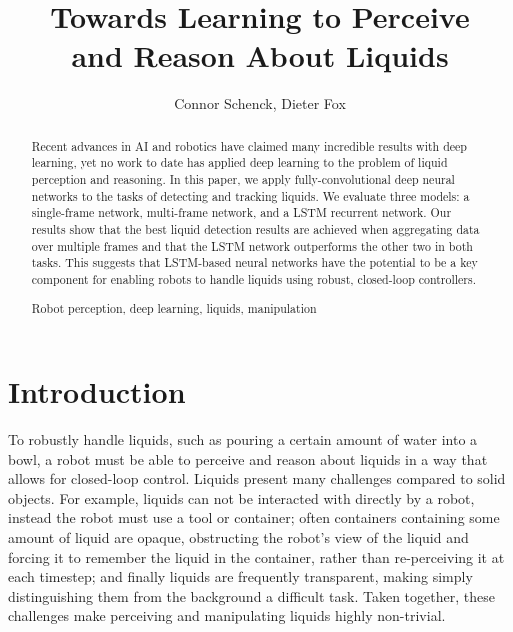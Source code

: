\documentclass[runningheads,a4paper]{llncs}
\newcommand{\keywords}[1]{\par\addvspace\baselineskip
\noindent\keywordname\enspace\ignorespaces#1}
\begin{document}
\mainmatter  %

\title{Towards Learning to Perceive \\and Reason About Liquids \vspace{-0.5cm}}



\author{Connor Schenck, Dieter Fox \vspace{-0.3cm}}



\maketitle

\vspace{-0.5cm}
\begin{abstract}
Recent advances in AI and robotics have claimed many incredible results with deep learning, yet no work to date has applied deep learning to the problem of liquid perception and reasoning. In this paper, we apply fully-convolutional deep neural networks to the tasks of detecting and tracking liquids. We evaluate three models: a single-frame network, multi-frame network, and a LSTM recurrent network. Our results show that the best liquid detection results are achieved when aggregating data over multiple frames and that the LSTM network outperforms the other two in both tasks. This suggests that LSTM-based neural networks have the potential to be a key component for enabling robots to handle liquids using robust, closed-loop controllers.
\keywords{Robot perception, deep learning, liquids, manipulation}
\end{abstract}


\section{Introduction}

To robustly handle liquids, such as pouring a certain amount of water into a
bowl, a robot must be able to perceive and reason about liquids in a way that
allows for closed-loop control. Liquids present many challenges compared to
solid objects. For example, liquids can not be interacted with directly by a
robot, instead the robot must use a tool or container; often containers
containing some amount of liquid are opaque, obstructing the robot's view of the
liquid and forcing it to remember the liquid in the container, rather than
re-perceiving it at each timestep; and finally liquids are frequently
transparent, making simply distinguishing them from the background a difficult
task. Taken together, these challenges make perceiving and manipulating liquids
highly non-trivial.
\end{document}
